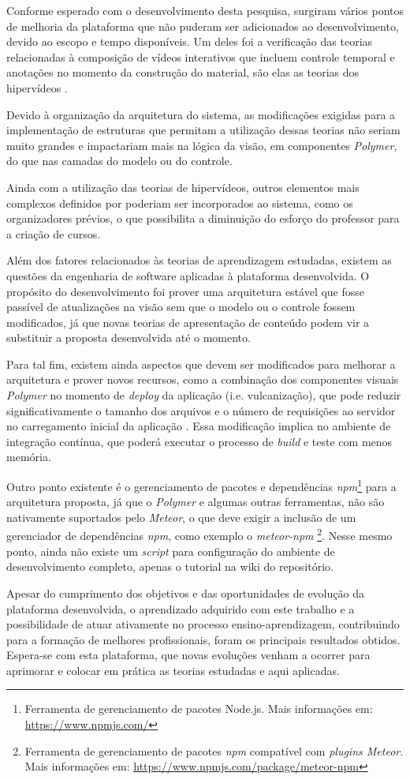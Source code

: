 Conforme esperado com o desenvolvimento desta pesquisa, surgiram vários pontos de melhoria da plataforma que não puderam ser adicionados ao desenvolvimento, devido ao escopo e tempo disponíveis. Um deles foi a verificação das teorias relacionadas à composição de vídeos interativos que incluem controle temporal e anotações no momento da construção do material, são elas as teorias dos hipervídeos \cite{Sadallah2012}.

Devido à organização da arquitetura do sistema, as modificações exigidas para a implementação de estruturas que permitam a utilização dessas teorias não seriam muito grandes e impactariam mais na lógica da visão, em componentes \textit{Polymer}, do que nas camadas do modelo ou do controle.

Ainda com a utilização das teorias de hipervídeos, outros elementos mais complexos definidos por  poderiam ser incorporados ao sistema, como os organizadores prévios, o que possibilita a diminuição do esforço do professor para a criação de cursos.

Além dos fatores relacionados às teorias de aprendizagem estudadas, existem as questões da engenharia de software aplicadas à plataforma desenvolvida. O propósito do desenvolvimento foi prover uma arquitetura estável que fosse passível de atualizações na visão sem que o modelo ou o controle fossem modificados, já que novas teorias de apresentação de conteúdo podem vir a substituir a proposta desenvolvida até o momento.

Para tal fim, existem ainda aspectos que devem ser modificados para melhorar a arquitetura e prover novos recursos, como a combinação dos componentes visuais \textit{Polymer} no momento de \textit{deploy} da aplicação (i.e. vulcanização), que pode reduzir significativamente o tamanho dos arquivos e o número de requisições ao servidor no carregamento inicial da aplicação \cite{vulcanize2013}. Essa modificação implica no ambiente de integração contínua, que poderá executar o processo de \textit{build} e teste com menos memória.

Outro ponto existente é o gerenciamento de pacotes e dependências \textit{npm}\footnote{Ferramenta de gerenciamento de pacotes Node.js. Mais informações em: \url{https://www.npmjs.com/}} para a arquitetura proposta, já que o \textit{Polymer} e algumas outras ferramentas, não são nativamente suportados pelo \textit{Meteor}, o que deve exigir a inclusão de um gerenciador de dependências \textit{npm}, como exemplo o \textit{meteor-npm} \footnote{Ferramenta de gerenciamento de pacotes \textit{npm} compatível com \textit{plugins Meteor}. Mais informações em: \url{https://www.npmjs.com/package/meteor-npm}}. Nesse mesmo ponto, ainda não existe um \textit{script} para configuração do ambiente de desenvolvimento completo, apenas o tutorial na wiki do repositório. 

Apesar do cumprimento dos objetivos e das oportunidades de evolução da plataforma desenvolvida, o aprendizado adquirido com este trabalho e a possibilidade de atuar ativamente no processo ensino-aprendizagem, contribuindo para a formação de melhores profissionais, foram os principais resultados obtidos. Espera-se com esta plataforma, que novas evoluções venham a ocorrer para aprimorar e colocar em prática as teorias estudadas e aqui aplicadas.
